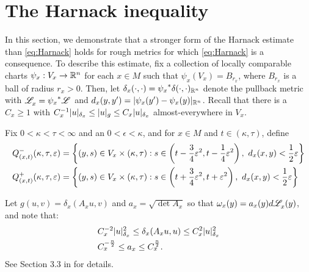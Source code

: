 \documentclass[a4paper, 12pt]{amsart}
\begin{document}
\section{The Harnack inequality}
\label{sec:harnack}

In this section, we demonstrate that a
stronger form of the  Harnack 
estimate than \eqref{eq:Harnack} holds for rough 
metrics for which  \eqref{eq:Harnack} is a consequence.
To describe this estimate, fix a collection of 
locally comparable charts $\psi_x:V_x \to \mathbb{R}^n$ 
for each $x \in M$ such that $\psi_x(V_x) = B_{r_x}$,
where $B_{r_x}$ is a ball of radius $r_x > 0$. 
Then, let
$\delta_x(\cdot, \cdot) = {\psi_x}^\ast\delta(\cdot, \cdot)_{\mathbb{R}^n}$
denote the pullback metric with $\mathscr{L}^{{}}_x = {\psi_x}^\ast\mathscr{L}^{{}}$
and $d_x(y,y') = |\psi_x(y') - \psi_x(y)|_{\mathbb{R}^n}$.
Recall that there is a $C_x \geq 1$
with $C_x^{-1}  |u|_{\delta_x} \leq |u|_g \leq C_x |u|_{\delta_x}$
almost-everywhere in $V_x$.

Fix $0 < \kappa < \tau < \infty$ and an $0 < \epsilon < \kappa$,
and for $x \in M$ and $t \in (\kappa, \tau)$, define
\begin{equation}
\label{eq:paradef}
\begin{split} 
Q^-_{(x,t)}(\kappa, \tau, \epsilon) &= \set{(y,s) \in V_x \times (\kappa,\tau): s \in \cbrac{t - \frac{3}{4}\epsilon^2, t - \frac{1}{4} \epsilon^2},\ 
	d_x(x,y) < \frac{1}{2} \epsilon} \\
Q^+_{(x,t)}(\kappa, \tau, \epsilon) &= \set{(y,s) \in V_x \times (\kappa,\tau): s \in \cbrac{t + \frac{3}{4}\epsilon^2, t + \epsilon^2},\ 
	d_x(x,y) < \frac{1}{2} \epsilon}
\end{split}
\end{equation}

Let $g(u,v) = \delta_x(A_x u,v)$
and $a_x = \sqrt{\det A_x}$ so that
$\omega_x(y) = a_x(y)d\mathscr{L}^{{}}_x(y)$, and note
that:
\begin{equation}
\label{eq:constbd}
\begin{split}
&C_x^{-2} |u|_{\delta_x}^2 \leq \delta_x(A_x u, u) \leq C_x^2 |u|_{\delta_x}^2 \\
&C_x^{-\frac{n}{2}} \leq a_x \leq C_x^{\frac{n}{2}}.
\end{split}
\end{equation}
See Section 3.3 in \cite{BRough} for details. 
\end{document}
